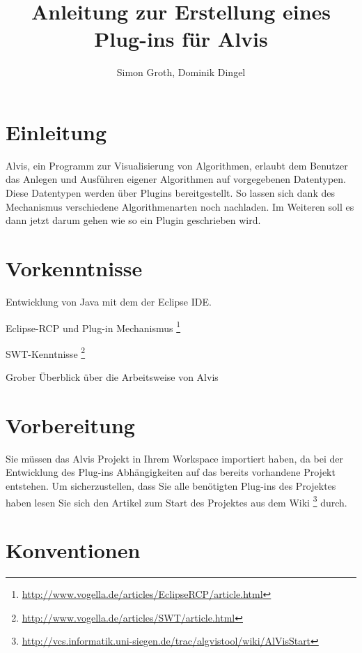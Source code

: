 \documentclass[10pt,a4paper]{article}
\author{Simon Groth, Dominik Dingel}
\title{Anleitung zur Erstellung eines Plug-ins für Alvis}
\begin{document}
\maketitle

\tableofcontents

\section{Einleitung}
Alvis, ein Programm zur Visualisierung von Algorithmen, erlaubt dem Benutzer das Anlegen und Ausführen eigener Algorithmen auf vorgegebenen Datentypen. Diese Datentypen werden über Plugins bereitgestellt. So lassen sich dank des Mechanismus verschiedene Algorithmenarten noch nachladen. Im Weiteren soll es dann jetzt darum gehen wie so ein Plugin geschrieben wird.

\section{Vorkenntnisse}
\begin{list}{-}{Sie sollten über folgende Kenntnisse verfügen.}
\item Entwicklung von Java mit dem der Eclipse IDE.
\item Eclipse-RCP und Plug-in Mechanismus
\footnote{\href{http://www.vogella.de/articles/EclipseRCP/article.html}{http://www.vogella.de/articles/EclipseRCP/article.html}} 
\item SWT-Kenntnisse
\footnote{\href{http://www.vogella.de/articles/SWT/article.html}{http://www.vogella.de/articles/SWT/article.html}}
\item Grober Überblick über die Arbeitsweise von Alvis
\end{list}
\section{Vorbereitung}
Sie müssen das Alvis Projekt in Ihrem Workspace importiert haben, da bei der Entwicklung des Plug-ins Abhängigkeiten auf das bereits vorhandene Projekt entstehen. Um sicherzustellen, dass Sie alle benötigten Plug-ins des Projektes haben lesen Sie sich den Artikel zum Start des Projektes aus dem Wiki
\footnote{\href{http://vcs.informatik.uni-siegen.de/trac/algvistool/wiki/AlVisStart}{http://vcs.informatik.uni-siegen.de/trac/algvistool/wiki/AlVisStart}}
 durch.
\section{Konventionen}
\end{document}
